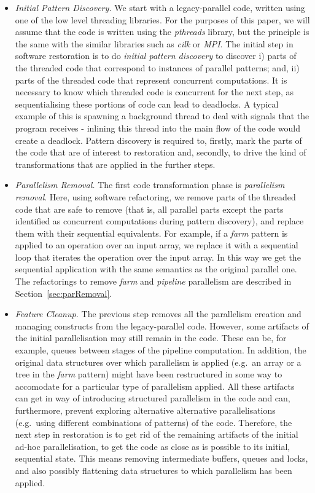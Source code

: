 \documentclass[runningheads]{llncs}
\begin{document}
\begin{itemize}
\item \emph{Initial Pattern Discovery.} We start with a legacy-parallel code, written using one of the low level threading libraries. For the purposes of this paper, we will assume that the code is written using the \emph{pthreads} library, but the principle is the same with the similar libraries such as \emph{cilk} or \emph{MPI}. The initial step in software restoration is to do \emph{initial pattern discovery} to discover i) parts of the threaded code that correspond to instances of parallel patterns; and, ii) parts of the threaded code that represent concurrent computations. It is necessary to know which threaded code is concurrent for the next step, as sequentialising these portions of code can lead to deadlocks. A typical example of this is spawning a background thread to deal with signals that the program receives - inlining this thread into the main flow of the code would create a deadlock. Pattern discovery is required to, firstly, mark the parts of the code that are of interest to restoration and, secondly, to drive the kind of transformations that are applied in the further steps.

\item \emph{Parallelism Removal.} The first code transformation phase is \emph{parallelism removal}. Here, using software refactoring, we remove parts of the threaded code  that are safe to remove (that is, all parallel parts except the parts identified as concurrent computations during pattern discovery), and replace them with their sequential equivalents. For example, if a \emph{farm} pattern is applied to an operation over an input array, we replace it with a sequential loop that iterates the operation over the input array. In this way we get the sequential application with the same semantics as the original parallel one. The refactorings to remove \emph{farm} and \emph{pipeline} parallelism are described in Section~\ref{sec:parRemoval}.

\item \emph{Feature Cleanup.} The previous step removes all the parallelism creation and managing constructs from the legacy-parallel code. However, some artifacts of the initial parallelisation may still remain in the code. These can be, for example, queues between stages of the pipeline computation. In addition, the original data structures over which parallelism is applied (e.g.~an array or a tree in the \emph{farm} pattern) might have been restructured in some way to accomodate for a particular type of parallelism applied. All these artifacts can get in way of introducing structured parallelism in the code and can, furthermore, prevent exploring alternative alternative parallelisations (e.g.~using different combinations of patterns) of the code. Therefore, the next step in restoration is to get rid of the remaining artifacts of the initial ad-hoc parallelisation, to get the code as close as is possible to its initial, sequential state. This means removing intermediate buffers, queues and locks, and also possibly flattening data structures to which parallelism has been applied. 
  

\end{itemize}
\end{document}
